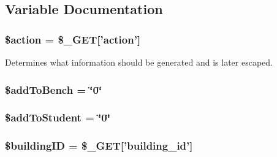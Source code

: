 \subsection{\-Variable \-Documentation}
\hypertarget{back__checkRooms_8php_aa698a3e72116e8e778be0e95d908ee30}{
\subsubsection[{\$action}]{\setlength{\rightskip}{0pt plus 5cm}\$action = \$\-\_\-\-G\-E\-T\mbox{[}'action'\mbox{]}}}\label{back__checkRooms_8php_aa698a3e72116e8e778be0e95d908ee30}
\-Determines what information should be generated and is later escaped. \hypertarget{back__checkRooms_8php_a203f48bd509ef90819599e761f574023}{
\subsubsection[{\$add\-To\-Bench}]{\setlength{\rightskip}{0pt plus 5cm}\$add\-To\-Bench = \char`\"{}0\char`\"{}}}\label{back__checkRooms_8php_a203f48bd509ef90819599e761f574023}
\hypertarget{back__checkRooms_8php_ab8b532875ded9bdf4075f627ddf2fa78}{
\subsubsection[{\$add\-To\-Student}]{\setlength{\rightskip}{0pt plus 5cm}\$add\-To\-Student = \char`\"{}0\char`\"{}}}\label{back__checkRooms_8php_ab8b532875ded9bdf4075f627ddf2fa78}
\hypertarget{back__checkRooms_8php_acfaa0ff73c631ce07c4851ed12fcd83d}{
\subsubsection[{\$building\-I\-D}]{\setlength{\rightskip}{0pt plus 5cm}\$building\-I\-D = \$\-\_\-\-G\-E\-T\mbox{[}'building\-\_\-id'\mbox{]}}}\label{back__checkRooms_8php_acfaa0ff73c631ce07c4851ed12fcd83d}
